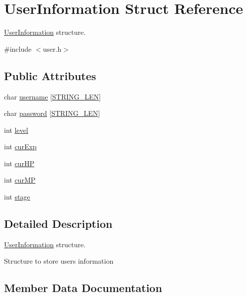 \hypertarget{structUserInformation}{}\section{User\+Information Struct Reference}
\label{structUserInformation}


\hyperlink{structUserInformation}{User\+Information} structure.  




{\ttfamily \#include $<$user.\+h$>$}

\subsection*{Public Attributes}
\begin{DoxyCompactItemize}
\item 
char \hyperlink{structUserInformation_a77933224f8f87f2e654e92c76fb2d766}{username} \mbox{[}\hyperlink{user_8h_ad6d94ce273637446121c9cbd16b6077f}{S\+T\+R\+I\+N\+G\+\_\+\+L\+EN}\mbox{]}
\item 
char \hyperlink{structUserInformation_a66b4cce1e45147134854d32bae6c8afb}{password} \mbox{[}\hyperlink{user_8h_ad6d94ce273637446121c9cbd16b6077f}{S\+T\+R\+I\+N\+G\+\_\+\+L\+EN}\mbox{]}
\item 
int \hyperlink{structUserInformation_a4002ec89b3a2c70dc7580387ce815bf9}{level}
\item 
int \hyperlink{structUserInformation_a541dd7aacc649101b06724249a6e76a2}{cur\+Exp}
\item 
int \hyperlink{structUserInformation_ab1be2caa399b928082c8da358c156f65}{cur\+HP}
\item 
int \hyperlink{structUserInformation_a077a4bff3ec5ef102345ebb6a2768239}{cur\+MP}
\item 
int \hyperlink{structUserInformation_a3ad74546e96bda1f918d34ba6694bcd6}{stage}
\end{DoxyCompactItemize}


\subsection{Detailed Description}
\hyperlink{structUserInformation}{User\+Information} structure. 

Structure to store user\textquotesingle{}s information 

\subsection{Member Data Documentation}
\mbox{\label{structUserInformation_a541dd7aacc649101b06724249a6e76a2}} 
